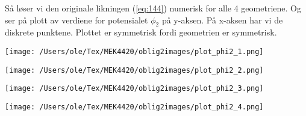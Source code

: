 Så løser vi den originale likningen (\ref{eq:144}) numerisk for alle 4 geometriene. Og ser på plott av verdiene for potensialet $\phi_2$ på y-aksen. På x-aksen har vi de diskrete punktene. Plottet er symmetrisk fordi geometrien er symmetrisk.
\noindent
\begin{minipage}[t]{0.45\linewidth}
    \texttt{[image: /Users/ole/Tex/MEK4420/oblig2images/plot\_phi2\_1.png]}
\end{minipage}
\hspace{0.05\linewidth}
\begin{minipage}[t]{0.45\linewidth}
    \texttt{[image: /Users/ole/Tex/MEK4420/oblig2images/plot\_phi2\_2.png]}
\end{minipage}

\vspace{0.5cm} %

\noindent
\begin{minipage}[t]{0.45\linewidth}
    \texttt{[image: /Users/ole/Tex/MEK4420/oblig2images/plot\_phi2\_3.png]}
\end{minipage}
\hspace{0.05\linewidth}
\begin{minipage}[t]{0.45\linewidth}
    \texttt{[image: /Users/ole/Tex/MEK4420/oblig2images/plot\_phi2\_4.png]}
\end{minipage}